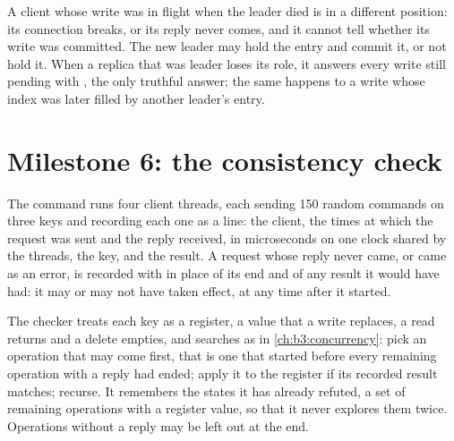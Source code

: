 A client whose write was in flight when the leader died is in a different position: its connection breaks, or its reply never comes, and it cannot tell whether its write was committed. The new leader may hold the entry and commit it, or not hold it. When a replica that was leader loses its role, it answers every write still pending with , the only truthful answer; the same happens to a write whose index was later filled by another leader's entry.

\label{lst:b3:project-replicated-store:apply}

\section{Milestone 6: the consistency check}\label{sec:b3:project-replicated-store:check}

The command  runs four client threads, each sending 150 random commands on three keys and recording each one as a line: the client, the times at which the request was sent and the reply received, in microseconds on one clock shared by the threads, the key, and the result. A request whose reply never came, or came as an error, is recorded with  in place of its end and of any result it would have had: it may or may not have taken effect, at any time after it started.

The checker treats each key as a register, a value that a write replaces, a read returns and a delete empties, and searches as in \cref{ch:b3:concurrency}: pick an operation that may come first, that is one that started before every remaining operation with a reply had ended; apply it to the register if its recorded result matches; recurse. It remembers the states it has already refuted, a set of remaining operations with a register value, so that it never explores them twice. Operations without a reply may be left out at the end.

\label{lst:b3:project-replicated-store:lincheck}

